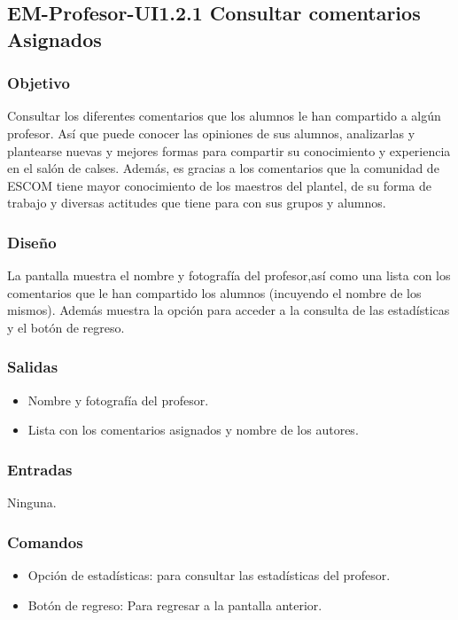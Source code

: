 
\subsection{EM-Profesor-UI1.2.1 Consultar comentarios Asignados}

\subsubsection{Objetivo}
	\noindent
	Consultar los diferentes comentarios que los alumnos le han compartido a algún profesor. Así que puede conocer las opiniones de sus alumnos, analizarlas y plantearse nuevas y mejores formas para compartir su conocimiento y experiencia en el salón de calses. Además, es gracias a los comentarios que la comunidad de ESCOM tiene mayor conocimiento de los maestros del plantel, de su forma de trabajo y diversas actitudes que tiene para con sus grupos y alumnos.

\subsubsection{Diseño}
	\noindent
	La pantalla muestra el nombre y fotografía del profesor,así como una lista con los comentarios que le han compartido los alumnos (incuyendo el nombre de los mismos).
	Además muestra la opción para acceder a la consulta de las estadísticas y el botón de regreso.

\pagebreak
{}

\subsubsection{Salidas}
	\begin{itemize}
		\item Nombre y fotografía del profesor.
		\item Lista con los comentarios asignados y nombre de los autores.
	\end{itemize}

\subsubsection{Entradas}
	\noindent
	Ninguna.

\subsubsection{Comandos}
	\begin{itemize}
		\item Opción de estadísticas: para consultar las estadísticas del profesor.
		\item Botón de regreso: Para regresar a la pantalla anterior.
	\end{itemize}

